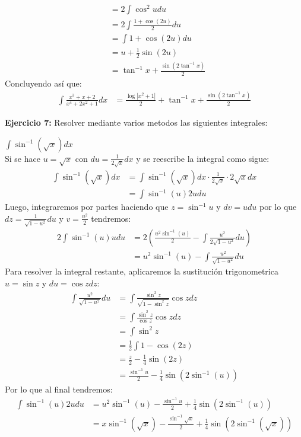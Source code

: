 \documentclass[../main.tex]{subfiles}
\begin{document}
\begin{partes}
\begin{align*}
            &= 2 \int \cos^2 u du\\
            &= 2 \int \frac{1 + \cos(2u)}{2} du\\
            &= \int 1 + \cos(2u) du\\
            &= u + \frac{1}{2} \sin(2u)\\
            &= \tan^{-1} x + \frac{\sin(2\tan^{-1} x)}{2}
        \end{align*}
        Concluyendo así que:
        \begin{align*}
            \int \frac{x^3+x+2}{x^4+2x^2+1} dx &= \frac{\log|x^2+1|}{2} + \tan^{-1} x + \frac{\sin(2\tan^{-1} x)}{2}
        \end{align*}
    \end{partes}

    \question \textbf{Ejercicio 7:} Resolver mediante varios metodos las siguientes integrales:
    \begin{partes}
        \parte $\int \sin^{-1}(\sqrt{x}) dx$\\
        
        Si se hace $u = \sqrt{x}$ con $du = \frac{1}{2\sqrt{x}} dx$ y se reescribe la integral como sigue:
        \begin{align*}
            \int \sin^{-1}(\sqrt{x}) dx &= \int \sin^{-1}(\sqrt{x}) dx \cdot \frac{1}{2\sqrt{x}} \cdot 2\sqrt{x} dx\\
            &= \int \sin^{-1}(u) 2u du
        \end{align*}
        Luego, integraremos por partes haciendo que $z = \sin^{-1} u$ y $dv = u du$ por lo que $dz = \frac{1}{\sqrt{1-u^2}} du$ y $v = \frac{u^2}{2}$ tendremos:
        \begin{align*}
            2 \int \sin^{-1}(u) u du &= 2\left(\frac{u^2\sin^{-1}(u)}{2} - \int \frac{u^2}{2\sqrt{1-u^2}} du\right)\\
            &=u^2\sin^{-1}(u) - \int \frac{u^2}{\sqrt{1-u^2}} du
        \end{align*}
        Para resolver la integral restante, aplicaremos la sustitución trigonometrica $u = \sin z$ y $du = \cos z dz$:
        \begin{align*}
            \int \frac{u^2}{\sqrt{1-u^2}} du &=\int \frac{\sin^2 z}{\sqrt{1-\sin^2 z}} \cos z dz\\
            &= \int \frac{\sin^2 z}{\cos z} \cos z dz\\
            &= \int \sin^2 z\\
            &= \frac{1}{2}\int 1-\cos(2z)\\
            &= \frac{z}{2} - \frac{1}{4} \sin(2z)\\
            &= \frac{\sin^{-1} u}{2} - \frac{1}{4} \sin(2\sin^{-1}(u)) 
        \end{align*}
        Por lo que al final tendremos:
        \begin{align*}
            \int \sin^{-1}(u) 2u du &= u^2\sin^{-1}(u) - \frac{\sin^{-1} u}{2} +\frac{1}{4} \sin(2\sin^{-1}(u))\\
            &=  x\sin^{-1}(\sqrt{x}) - \frac{\sin^{-1} \sqrt{x}}{2} +\frac{1}{4} \sin(2\sin^{-1}(\sqrt{x}))
        \end{align*}
    \end{partes}
    
\end{document}
